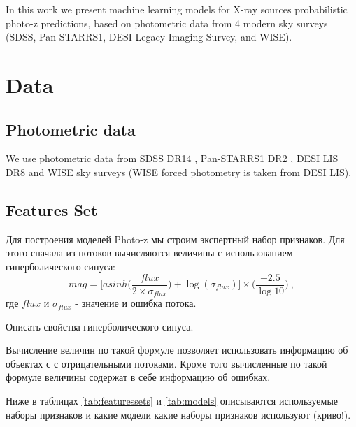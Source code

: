 \documentclass[fleqn,usenatbib]{mnras}
\begin{document}
In this work we present machine learning models for X-ray sources probabilistic photo-z predictions, based on photometric data from 4 modern sky surveys (SDSS, Pan-STARRS1, DESI Legacy Imaging Survey, and WISE).


\section{Data}
\subsection{Photometric data}
We use photometric data from SDSS DR14 \citep{2018ApJS..235...42A}, Pan-STARRS1 DR2 \citep{2018AAS...23110201C}, DESI LIS DR8 \citep{2019AJ....157..168D} and WISE \citep{2010AJ....140.1868W} sky surveys (WISE forced photometry is taken from DESI LIS).
\subsection{Features Set}
Для построения моделей Photo-z мы строим экспертный набор признаков. Для этого сначала из потоков вычисляются величины с использованием гиперболического синуса:
\begin{equation}\label{eq:asinhmag}
    mag = \Bigg[asinh\Bigg(\frac{flux}{2 \times \sigma_{flux}}\Bigg) + \log(\sigma_{flux})\Bigg] \times \Bigg(\frac{-2.5}{\log 10}\Bigg) ~,
\end{equation}
где $flux$ и $\sigma_{flux}$ - значение и ошибка потока.

Описать свойства гиперболического синуса.

Вычисление величин по такой формуле позволяет использовать информацию об объектах с с отрицательными потоками. Кроме того вычисленные по такой формуле величины содержат в себе информацию об ошибках.

Ниже в таблицах \ref{tab:featuressets} и \ref{tab:models} описываются используемые наборы признаков и какие модели какие наборы признаков используют (криво!). 
\end{document}
